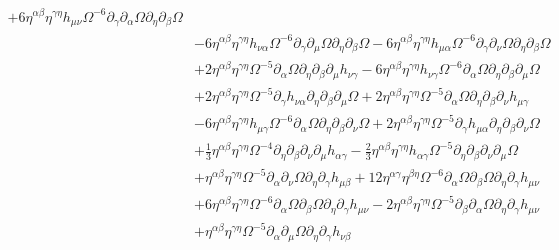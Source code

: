 \documentclass[10pt,letterpaper]{article}
\begin{document}
\begin{align}
 + 6 \eta^{\alpha \beta} \eta^{\gamma \eta} h_{\mu \nu} \Omega^{-6} \partial_{\gamma}\partial_{\alpha}\Omega \partial_{\eta}\partial_{\beta}\Omega\nonumber\\
& - 6 \eta^{\alpha \beta} \eta^{\gamma \eta} h_{\nu \alpha} \Omega^{-6} \partial_{\gamma}\partial_{\mu}\Omega \partial_{\eta}\partial_{\beta}\Omega
 - 6 \eta^{\alpha \beta} \eta^{\gamma \eta} h_{\mu \alpha} \Omega^{-6} \partial_{\gamma}\partial_{\nu}\Omega \partial_{\eta}\partial_{\beta}\Omega\nonumber\\
& + 2 \eta^{\alpha \beta} \eta^{\gamma \eta} \Omega^{-5} \partial_{\alpha}\Omega \partial_{\eta}\partial_{\beta}\partial_{\mu}h_{\nu \gamma}
 - 6 \eta^{\alpha \beta} \eta^{\gamma \eta} h_{\nu \gamma} \Omega^{-6} \partial_{\alpha}\Omega \partial_{\eta}\partial_{\beta}\partial_{\mu}\Omega\nonumber\\
& + 2 \eta^{\alpha \beta} \eta^{\gamma \eta} \Omega^{-5} \partial_{\gamma}h_{\nu \alpha} \partial_{\eta}\partial_{\beta}\partial_{\mu}\Omega
 + 2 \eta^{\alpha \beta} \eta^{\gamma \eta} \Omega^{-5} \partial_{\alpha}\Omega \partial_{\eta}\partial_{\beta}\partial_{\nu}h_{\mu \gamma}\nonumber\\
& - 6 \eta^{\alpha \beta} \eta^{\gamma \eta} h_{\mu \gamma} \Omega^{-6} \partial_{\alpha}\Omega \partial_{\eta}\partial_{\beta}\partial_{\nu}\Omega
 + 2 \eta^{\alpha \beta} \eta^{\gamma \eta} \Omega^{-5} \partial_{\gamma}h_{\mu \alpha} \partial_{\eta}\partial_{\beta}\partial_{\nu}\Omega\nonumber\\
& + \tfrac{1}{3} \eta^{\alpha \beta} \eta^{\gamma \eta} \Omega^{-4} \partial_{\eta}\partial_{\beta}\partial_{\nu}\partial_{\mu}h_{\alpha \gamma}
 -  \tfrac{2}{3} \eta^{\alpha \beta} \eta^{\gamma \eta} h_{\alpha \gamma} \Omega^{-5} \partial_{\eta}\partial_{\beta}\partial_{\nu}\partial_{\mu}\Omega\nonumber\\
& + \eta^{\alpha \beta} \eta^{\gamma \eta} \Omega^{-5} \partial_{\alpha}\partial_{\nu}\Omega \partial_{\eta}\partial_{\gamma}h_{\mu \beta}
 + 12 \eta^{\alpha \gamma} \eta^{\beta \eta} \Omega^{-6} \partial_{\alpha}\Omega \partial_{\beta}\Omega \partial_{\eta}\partial_{\gamma}h_{\mu \nu}\nonumber\\
& + 6 \eta^{\alpha \beta} \eta^{\gamma \eta} \Omega^{-6} \partial_{\alpha}\Omega \partial_{\beta}\Omega \partial_{\eta}\partial_{\gamma}h_{\mu \nu}
 - 2 \eta^{\alpha \beta} \eta^{\gamma \eta} \Omega^{-5} \partial_{\beta}\partial_{\alpha}\Omega \partial_{\eta}\partial_{\gamma}h_{\mu \nu}\nonumber\\
& + \eta^{\alpha \beta} \eta^{\gamma \eta} \Omega^{-5} \partial_{\alpha}\partial_{\mu}\Omega \partial_{\eta}\partial_{\gamma}h_{\nu \beta}

\end{align}
\end{document}
